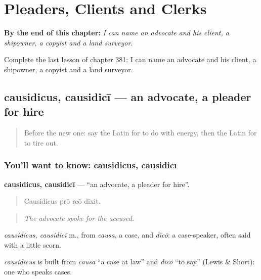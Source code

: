 
\chapter{Pleaders, Clients and Clerks}
\label{ch:la-pleaders-clients-and-clerks}

\begin{chapteropening}
\textbf{By the end of this chapter:} \emph{I can name an advocate and his client, a shipowner, a copyist and a land surveyor.}

Complete the last lesson of chapter 381: I can name an advocate and his client, a shipowner, a copyist and a land surveyor.
\end{chapteropening}

\section[causidicus, causidicī]{causidicus, causidicī — an advocate, a pleader for hire}

\label{lesson:LA-C381-causidicus}



\begin{quote}
Before the new one: say the Latin for to do with energy, then the Latin for to tire out.
\end{quote}

\subsection*{You'll want to know: causidicus, causidicī}
\textbf{causidicus, causidicī} — \textquotedblleft{}an advocate, a pleader for hire\textquotedblright{}.

\begin{quote}
Causidicus prō reō dīxit.
\end{quote}

\begin{quote}
\emph{The advocate spoke for the accused.}
\end{quote}

\emph{causidicus, causidicī} m., from \emph{causa}, a case, and \emph{dīcō}: a case-speaker, often said with a little scorn.

\begin{cousinweb}
\emph{causidicus} is built from \emph{causa} \textquotedblleft{}a case at law\textquotedblright{} and \emph{dīcō} \textquotedblleft{}to say\textquotedblright{} (Lewis \& Short): one who speaks cases.
\end{cousinweb}

